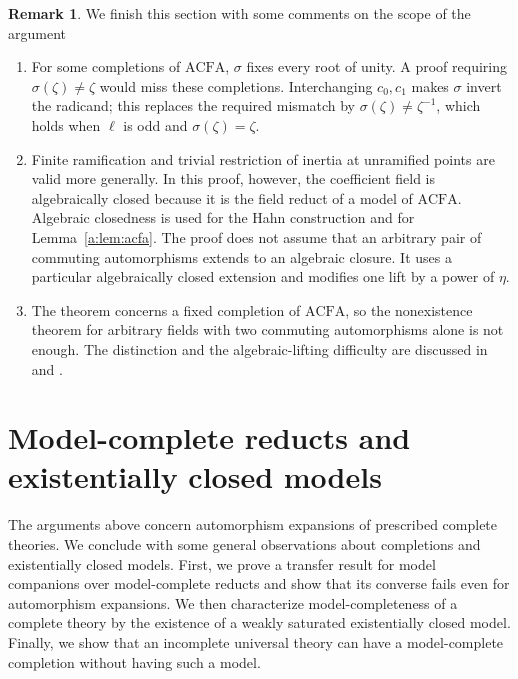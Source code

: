 \documentclass[10pt,a4paper]{amsart}
\theoremstyle{definition}
\newtheorem{remark}[theorem]{Remark}
\newcommand{\ACFA}{\mathrm{ACFA}}
\begin{document}
\begin{remark}We finish this section with some comments on the scope of the argument
\begin{enumerate}
  \item For some completions of $\ACFA$, $\sigma$ fixes every root of unity. A proof requiring $\sigma(\zeta)\neq\zeta$ would miss these completions. Interchanging $c_0,c_1$ makes $\sigma$ invert the radicand; this replaces the required mismatch by $\sigma(\zeta)\neq\zeta^{-1}$, which holds when $\ell$ is odd and $\sigma(\zeta)=\zeta$.

  \item Finite ramification and trivial restriction of inertia at unramified points are valid more generally. In this proof, however, the coefficient field is algebraically closed because it is the field reduct of a model of $\ACFA$. Algebraic closedness is used for the Hahn construction and for Lemma~\ref{a:lem:acfa}. The proof does not assume that an arbitrary pair of commuting automorphisms extends to an algebraic closure. It uses a particular algebraically closed extension and
modifies one lift by a power of $\eta$.

  \item The theorem concerns a fixed completion of $\ACFA$, so the nonexistence theorem for arbitrary fields with two commuting automorphisms alone is not enough. The distinction and the algebraic-lifting difficulty are discussed in \cite[Section 3]{KikyoSurvey} and \cite[Remark 1.12]{Survey}.
\end{enumerate}
\end{remark}


\section{Model-complete reducts and existentially closed models}
\label{sec:mc-reducts}

The arguments above concern automorphism expansions of prescribed
complete theories. We conclude with some general observations
about completions and existentially closed models.
First, we prove a transfer result for model companions over
model-complete reducts and show that its converse fails even
for automorphism expansions. We then characterize model-completeness
of a complete theory by the existence of a weakly saturated
existentially closed model. Finally, we show that an incomplete
universal theory can have a model-complete completion without
having such a model.
\end{document}
